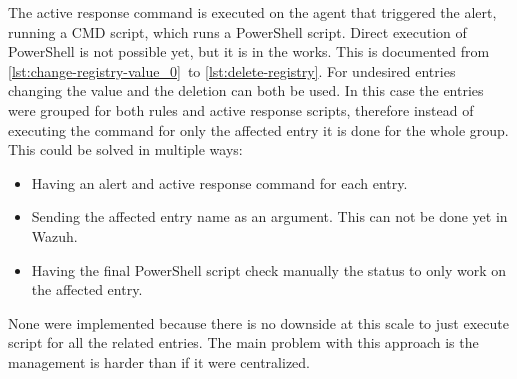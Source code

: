 \linej
\linej
The active response command is executed on the agent that triggered the alert, running a CMD script, which runs a PowerShell script.
Direct execution of PowerShell is not possible yet, but it is in the works.
This is documented from \ref{lst:change-registry-value_0}\ to \ref{lst:delete-registry}.
For undesired entries changing the value and the deletion can both be used.
\linej
\linej
In this case the entries were grouped for both rules and active response scripts, therefore instead of executing the command for only the affected entry it is done for the whole group.
This could be solved in multiple ways:
\begin{itemize}
	\item Having an alert and active response command for each entry.
	\item Sending the affected entry name as an argument. This can not be done yet in Wazuh.
	\item Having the final PowerShell script check manually the status to only work on the affected entry.
\end{itemize}
\linej
None were implemented because there is no downside at this scale to just execute script for all the related entries.
The main problem with this approach is the management is harder than if it were centralized.

